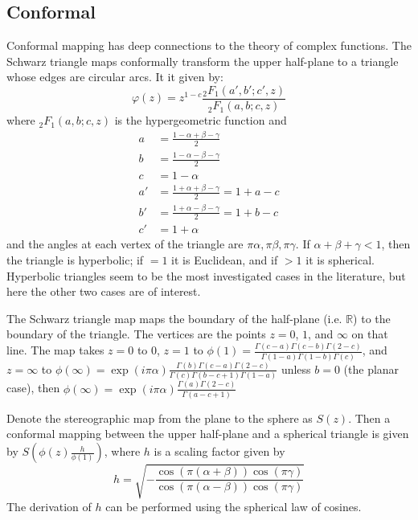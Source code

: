 \documentclass{amsart}[12pt]
\begin{document}
\subsection{Conformal}
Conformal mapping has deep connections to the theory of complex functions.
The Schwarz triangle maps conformally transform the upper half-plane to a
triangle whose edges are circular arcs. It it given by:
\begin{equation}
   \varphi(z) = z^{1-c} \frac{_2 F_1(a',b';c',z)}{_2 F_1(a,b;c,z)}
\end{equation}
where $_2 F_1(a,b;c,z)$ is the hypergeometric function and
\begin{equation}\begin{split}
   a & = \frac{1 - \alpha + \beta - \gamma}{2}\\
   b & = \frac{1 - \alpha - \beta - \gamma}{2}\\
   c & = 1 - \alpha\\
   a' &= \frac{1 + \alpha + \beta - \gamma}{2} = 1 + a - c\\
   b' &= \frac{1 + \alpha - \beta - \gamma}{2} = 1 + b - c\\
   c' &= 1 + \alpha
\end{split}\end{equation}
and the angles at each vertex of the triangle are $\pi \alpha, \pi \beta,
\pi \gamma$. If $\alpha + \beta + \gamma < 1$, then the triangle is hyperbolic;
if $=1$ it is Euclidean, and if $>1$ it is spherical. \cite{nehari} Hyperbolic
triangles seem to be the most investigated cases in the literature, but here the
other two cases are of interest.

The Schwarz triangle map maps the boundary of the half-plane (i.e. $\mathbb{R}$)
to the boundary of the triangle. The vertices are the points $z=0$, $1$, and
$\infty$ on that line. The map takes $z=0$ to $0$, $z=1$ to $\phi(1) =
\frac{\Gamma(c-a) \Gamma(c-b) \Gamma(2-c)}{\Gamma(1-a) \Gamma(1-b) \Gamma(c)}$,
and $z=\infty$ to $\phi(\infty) = \exp\left(i \pi \alpha \right)
\frac{\Gamma(b) \Gamma(c-a) \Gamma(2-c)}{\Gamma(c) \Gamma(b-c+1) \Gamma(1-a)}$
unless $b=0$ (the planar case), then $\phi(\infty) = \exp\left(i \pi \alpha \right)
\frac{\Gamma(a) \Gamma(2-c)}{\Gamma(a-c+1)}$

Denote the stereographic map from the plane to the sphere as $S(z)$. Then a
conformal mapping between the upper half-plane and a spherical triangle is
given by $S\left(\phi(z)\frac{h}{\phi(1)}\right)$, where $h$ is a scaling factor
given by
\begin{equation}
  h = \sqrt{ -\frac{\cos \left(\pi (\alpha+\beta)\right)
                    \cos\left(\pi\gamma\right)}
                   {\cos \left(\pi (\alpha-\beta)\right)
                    \cos\left(\pi\gamma\right)}}
\end{equation}
The derivation of $h$ can be performed using the spherical law of cosines.
\end{document}
